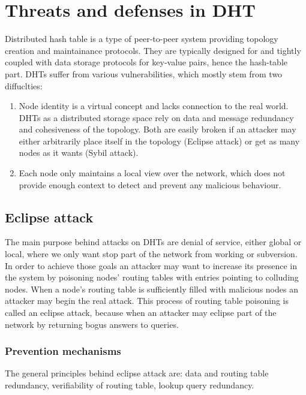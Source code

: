 \chapter{Threats and defenses in DHT}
  Distributed hash table is a type of peer-to-peer system providing topology
  creation and maintainance protocols. They are typically designed for and
  tightly coupled with data storage protocols for key-value pairs, hence the
  hash-table part. DHTs suffer from various vulnerabilities, which mostly stem
  from two diffuclties:
  \begin{enumerate}
    \item Node identity is a virtual concept and lacks connection to the real
      world. DHTs as a distributed storage space rely on data and message
      redundancy and cohesiveness of the topology. Both are easily broken if an
      attacker may either arbitrarily place itself in the topology (Eclipse
      attack) or get as many nodes as it wants (Sybil attack).

    \item Each node only maintains a local view over the network, which does not
      provide enough context to detect and prevent any malicious behaviour.
  \end{enumerate}

\section{Eclipse attack}
  The main purpose behind attacks on DHTs are denial of service, either global
  or local, where we only want stop part of the network from working or
  subversion. In order to achieve those goals an attacker may want to increase
  its presence in the system by poisoning nodes' routing tables with entries
  pointing to colluding nodes. When a node's routing table is sufficiently
  filled with malicious nodes an attacker may begin the real attack. This
  process of routing table poisoning is called an eclipse attack, because when
  an attacker may eclipse part of the network by returning bogus answers to
  queries.

  \subsection{Prevention mechanisms}

  The general principles behind eclipse attack are: data and routing table
  redundancy, verifiability of routing table, lookup query redundancy.



